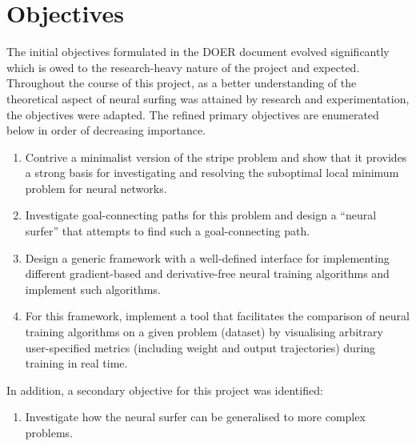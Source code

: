 \section{Objectives}
The initial objectives formulated in the DOER document evolved significantly which is owed to the research-heavy nature of the project and expected.
Throughout the course of this project, as a better understanding of the theoretical aspect of neural surfing was attained by research and experimentation, the objectives were adapted.
The refined primary objectives are enumerated below in order of decreasing importance.
\begin{enumerate}
    \item Contrive a minimalist version of the stripe problem and show that it provides a strong basis for investigating and resolving the suboptimal local minimum problem for neural networks.
    \item Investigate goal-connecting paths for this problem and design a “neural surfer” that attempts to find such a goal-connecting path.
    \item Design a generic framework with a well-defined interface for implementing different gradient-based and derivative-free neural training algorithms and implement such algorithms.
    \item For this framework, implement a tool that facilitates the comparison of neural training algorithms on a given problem (dataset) by visualising arbitrary user-specified metrics (including weight and output trajectories) during training in real time.
\end{enumerate}
In addition, a secondary objective for this project was identified:
\begin{enumerate}
    \item Investigate how the neural surfer can be generalised to more complex problems.
\end{enumerate}

